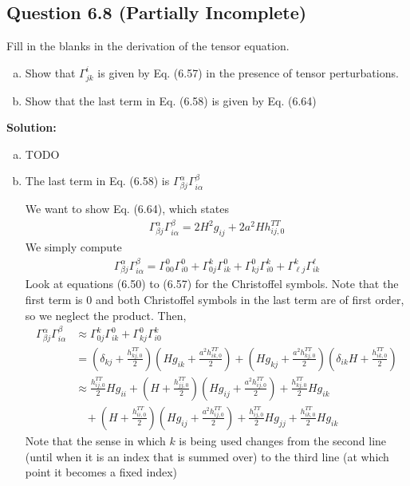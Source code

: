 \documentclass[11pt]{article}
\begin{document}
\subsection{Question 6.8 (Partially Incomplete)}
Fill in the blanks in the derivation of the tensor equation.
\begin{enumerate}[(a)]
    \item Show that $\Gamma^i_{jk}$ is given by Eq. (6.57) in the presence of tensor perturbations.
    \item Show that the last term in Eq. (6.58) is given by Eq. (6.64) 
\end{enumerate}

\textbf{Solution: }
\begin{enumerate}[(a)]
    \item TODO 
    \item The last term in Eq. (6.58) is $\Gamma^\alpha_{\beta j}\Gamma^\beta_{i\alpha}$ 
    
    We want to show Eq. (6.64), which states 
    \begin{align*}
        \Gamma^\alpha_{\beta j}\Gamma^\beta_{i\alpha} = 2 H^2 g_{ij}  + 2a^2 H h_{ij, 0}^{TT}
    \end{align*}
    We simply compute 
    \begin{align*}
        \Gamma^\alpha_{\beta j}\Gamma^\beta_{i\alpha} = \Gamma^0_{00}\Gamma^0_{i0} + \Gamma^k_{0 j}\Gamma^0_{ik} + \Gamma^0_{k j}\Gamma^k_{i0} + \Gamma^k_{\ell j}\Gamma^\ell_{i k}
    \end{align*}
    Look at equations (6.50) to (6.57) for the Christoffel symbols. Note that the first term is 0 and both Christoffel symbols in the last term are of first order, so we neglect the product. Then, 
    \begin{align*}
        \Gamma^\alpha_{\beta j}\Gamma^\beta_{i\alpha} &\approx \Gamma^k_{0 j}\Gamma^0_{ik} + \Gamma^0_{k j}\Gamma^k_{i0} \\
        &= \left(\delta_{kj} + \frac{h_{kj,0}^{TT}}{2}\right)\left(Hg_{ik} + \frac{a^2 h_{ik,0}^{TT}}{2}\right) + 
        \left(Hg_{kj} + \frac{a^2 h_{kj,0}^{TT}}{2}\right)\left(\delta_{ik}H + \frac{h_{ik,0}^{TT}}{2}\right) \\
        &\approx \frac{h_{ij,0}^{TT}}{2}Hg_{ii} + \left(H + \frac{h_{jj,0}^{TT}}{2}\right)\left(Hg_{ij} + \frac{a^2 h_{ij,0}^{TT}}{2}\right) + \frac{h_{kj,0}^{TT}}{2}Hg_{ik} \\
        &~~~~ +\left(H + \frac{h_{ii,0}^{TT}}{2}\right)\left(Hg_{ij} + \frac{a^2 h_{ij,0}^{TT}}{2}\right) + \frac{h_{ij,0}^{TT}}{2} Hg_{jj} + \frac{h_{ik,0}^{TT}}{2}Hg_{ik}
    \end{align*}
    Note that the sense in which $k$ is being used changes from the second line (until when it is an index that is summed over) to the third line (at which point it becomes a fixed index) 
    

\end{enumerate}
\end{document}
